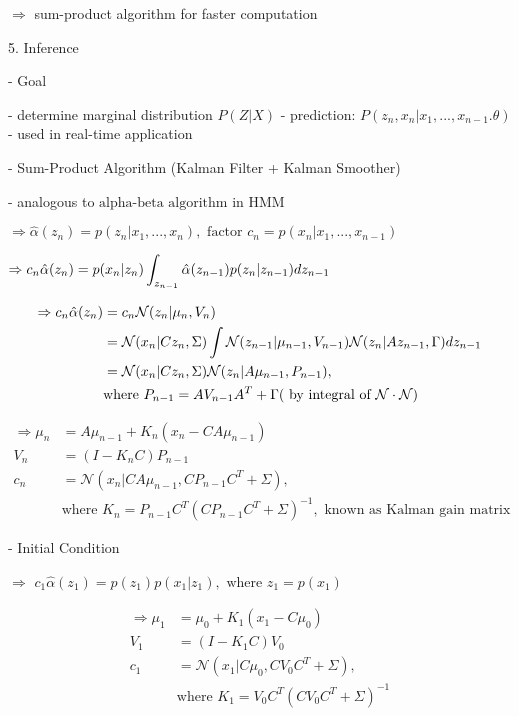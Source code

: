        $\Rightarrow$ sum-product algorithm for faster computation

5. Inference

   - Goal

     - determine marginal distribution $P(Z|X)$ 
     - prediction: $P(z_n, x_n|x_1,...,x_{n-1}.\theta)$ - used in real-time application

   - Sum-Product Algorithm (Kalman Filter + Kalman Smoother)

     - analogous to $\text{alpha-beta algorithm}$ in HMM

       $\Rightarrow \hat \alpha(z_n) = p(z_n| x_1,...,x_n), \text{ factor } c_n=p(x_n|x_1,...,x_{n-1})$  

       $ \displaystyle \Rightarrow c_n \hat\alpha(z_n) = p(x_n|z_n) \int_{z_{n-1}}\hat\alpha(z_{n-1}) p(z_n|z_{n-1}) \space d z_{n-1}$ 

       \begin{align}\displaystyle \Rightarrow c_n \hat \alpha(z_n) &= c_n \mathcal N(z_n|\mu_n,V_n) \\ &= \mathcal N (x_n|C z_n,\Sigma) \int \mathcal N(z_{n-1} | \mu_{n-1},V_{n-1}) \mathcal N(z_n|Az_{n-1} , \Gamma) \space d z_{n-1} \\ &= \mathcal N (x_n|C z_n,\Sigma) \space \mathcal N (z_n|A\mu_{n-1},P_{n-1}), \\ & \text{where } P_{n-1} = AV_{n-1}A^T+\Gamma \space ( \text{ by integral of } \mathcal N\cdot\mathcal N ) \end{align}

       \begin{align}\displaystyle \Rightarrow \mu_n &= A\mu_{n-1}  + K_n (x_n - CA\mu_{n-1}) \\ V_n &= (I-K_nC) P_{n-1} \\ c_n &= \mathcal N(x_n| CA\mu_{n-1} , CP_{n-1}C^T + \Sigma), \\ & \text{where } K_n = P_{n-1}C^T(CP_{n-1}C^T+\Sigma)^{-1}, \text{ known as Kalman gain matrix} \end{align}

     - Initial Condition

       $\Rightarrow$ $c_1 \hat \alpha (z_1) = p(z_1) p(x_1|z_1), \text{ where } z_1 = p(x_1)$ 

       \begin{align} \displaystyle \Rightarrow \mu_1 &= \mu_0 +K_1 (x_1-C\mu_0) \\ V_1 &= (I-K_1C)V_0 \\ c_1 &= \mathcal N(x_1 |C \mu_0 , CV_0C^T + \Sigma), \\ & \text{where } K_1 = V_0 C^T (CV_0C^T + \Sigma)^{-1} \end{align}

